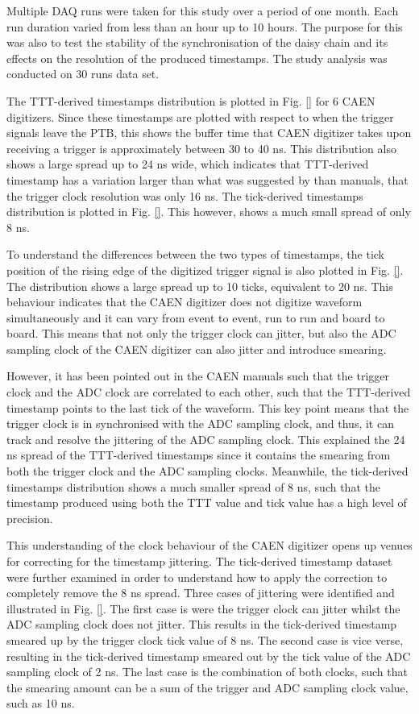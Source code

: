 Multiple DAQ runs were taken for this study over a period of one month.
Each run duration varied from less than an hour up to 10 hours.
The purpose for this was also to test the stability of the synchronisation of the daisy chain and its effects on the resolution of the produced timestamps. 
The study analysis was conducted on 30 runs data set.

The TTT-derived timestamps distribution is plotted in Fig. \ref {} for 6 CAEN digitizers.
Since these timestamps are plotted with respect to when the trigger signals leave the PTB, this shows the buffer time that CAEN digitizer takes upon receiving a trigger is approximately between 30 to 40 ns.
This distribution also shows a large spread up to 24 ns wide, which indicates that TTT-derived timestamp has a variation larger than what was suggested by than manuals, that the trigger clock resolution was only 16 ns.
The tick-derived timestamps distribution is plotted in Fig. \ref {}.
This however, shows a much small spread of only 8 ns.

To understand the differences between the two types of timestamps, the tick position of the rising edge of the digitized trigger signal is also plotted in Fig. \ref {}.
The distribution shows a large spread up to 10 ticks, equivalent to 20 ns.
This behaviour indicates that the CAEN digitizer does not digitize waveform simultaneously and it can vary from event to event, run to run and board to board.
This means that not only the trigger clock can jitter, but also the ADC sampling clock of the CAEN digitizer can also jitter and introduce smearing.

However, it has been pointed out in the CAEN manuals such that the trigger clock and the ADC clock are correlated to each other, such that the TTT-derived timestamp points to the last tick of the waveform.
This key point means that the trigger clock is in synchronised with the ADC sampling clock, and thus, it can track and resolve the jittering of the ADC sampling clock.
This explained the 24 ns spread of the TTT-derived timestamps since it contains the smearing from both the trigger clock and the ADC sampling clocks.
Meanwhile, the tick-derived timestamps distribution shows a much smaller spread of 8 ns, such that the timestamp produced using both the TTT value and tick value has a high level of precision.

This understanding of the clock behaviour of the CAEN digitizer opens up venues for correcting for the timestamp jittering.
The tick-derived timestamp dataset were further examined in order to understand how to apply the correction to completely remove the 8 ns spread.
Three cases of jittering were identified and illustrated in Fig. \ref{}.
The first case is were the trigger clock can jitter whilst the ADC sampling clock does not jitter.
This results in the tick-derived timestamp smeared up by the trigger clock tick value of 8 ns.
The second case is vice verse, resulting in the tick-derived timestamp smeared out by the tick value of the ADC sampling clock of 2 ns.
The last case is the combination of both clocks, such that the smearing amount can be a sum of the trigger and ADC sampling clock value, such as 10 ns.

